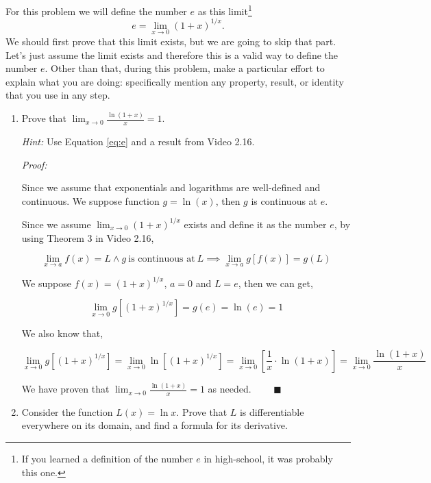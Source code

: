\documentclass[12pt]{exam}
\newcommand {\DS} [1] {${\displaystyle #1}$}
\newcommand{\vv}{\vspace{.1cm}}
\begin{document}
\begin{enumerate}
For this problem we will define the number $e$ as this limit\footnote{If you learned a definition of the number $e$ in high-school, it was probably this one.}
	\begin{equation}  \label{eq:e}
		e = \lim_{x \to 0} \left( 1 + x \right)^{1/x}.
	\end{equation}
We should first prove that this limit exists, but we are going to skip that part.  Let's just assume the limit exists and therefore this is a valid way to define the number $e$.
  Other than that, during this problem, make a particular effort to explain what you are doing: specifically mention any property, result, or identity that you use in any step.

	\begin{enumerate}
		\item  Prove that \DS{\lim_{x \to 0} \frac{\ln (1+x)}{x} = 1}.
		
			\emph{Hint:}  Use Equation \eqref{eq:e} and a result from Video 2.16.
		\vv
		
        \emph{Proof:}
        
        \vv
        
        Since we assume that exponentials and logarithms are well-defined and continuous. We suppose function $g=\ln(x)$, then $g$ is continuous at $e$.
        
        Since we assume $\lim_{x \to 0} \left( 1 + x \right)^{1/x}$ exists and define it as the number $e$, by using Theorem 3 in Video 2.16,
        
        $$
            \lim_{x \to a}f(x)=L \land {g\ \mbox{is continuous at}\ L} \implies \lim_{x \to a}g[f(x)]=g(L)
        $$
        
        We suppose $f(x)=\left( 1 + x \right)^{1/x}$, $a=0$ and $L=e$, then we can get,
        
        $$
            \lim_{x \to 0} g[\left( 1 + x \right)^{1/x}]=g(e)=\ln(e)=1
        $$
        
        We also know that,
        
        $$
            \lim_{x \to 0} g[\left( 1 + x \right)^{1/x}]=\lim_{x \to 0} \ln[\left( 1 + x \right)^{1/x}]=\lim_{x \to 0} [\frac{1}{x}\cdot\ln(1 + x)]=\lim_{x \to 0}\frac{\ln (1+x)}{x}
        $$
        
        We have proven that \DS{\lim_{x \to 0} \frac{\ln (1+x)}{x} = 1} as needed. $\qquad \blacksquare$
		\item  Consider the function $L(x) = \ln x$.  Prove that $L$ is differentiable everywhere on its domain, and find a formula for its derivative.
			

\end{enumerate}
\end{enumerate}
\end{document}
